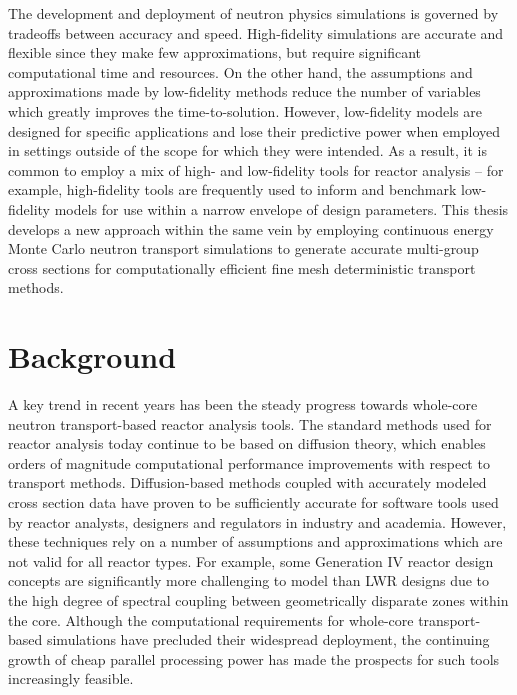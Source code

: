 The development and deployment of neutron physics simulations is governed by tradeoffs between accuracy and speed. High-fidelity simulations are accurate and flexible since they make few approximations, but require significant computational time and resources. On the other hand, the assumptions and approximations made by low-fidelity methods reduce the number of variables which greatly improves the time-to-solution. However, low-fidelity models are designed for specific applications and lose their predictive power when employed in settings outside of the scope for which they were intended. As a result, it is common to employ a mix of high- and low-fidelity tools for reactor analysis -- for example, high-fidelity tools are frequently used to inform and benchmark low-fidelity models for use within a narrow envelope of design parameters. This thesis develops a new approach within the same vein by employing continuous energy Monte Carlo neutron transport simulations to generate accurate multi-group cross sections for computationally efficient fine mesh deterministic transport methods.


\section{Background}
\label{sec:chap1-background}

A key trend in recent years has been the steady progress towards whole-core neutron transport-based reactor analysis tools. The standard methods used for reactor analysis today continue to be based on diffusion theory, which enables orders of magnitude computational performance improvements with respect to transport methods. Diffusion-based methods coupled with accurately modeled cross section data have proven to be sufficiently accurate for software tools used by reactor analysts, designers and regulators in industry and academia. However, these techniques rely on a number of assumptions and approximations which are not valid for all reactor types. For example, some Generation IV reactor design concepts are significantly more challenging to model than \ac{LWR} designs due to the high degree of spectral coupling between geometrically disparate zones within the core. Although the computational requirements for whole-core transport-based simulations have precluded their widespread deployment, the continuing growth of cheap parallel processing power has made the prospects for such tools increasingly feasible.

